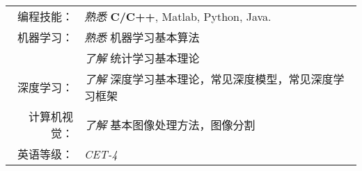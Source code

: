 %
%


 
\renewcommand{\arraystretch}{1.1}

	\begin{tabular}{>{}r>{}p{13cm}} 
		\textsc{编程技能：}     &  \emph{熟悉} \quad \textbf{C/C++}, Matlab, Python, Java.\\  
		\textsc{机器学习：} 	&  \emph{熟悉} \quad  机器学习基本算法 \\
							    &  \emph{了解} \quad  统计学习基本理论 \\
	    \textsc{深度学习：}     &  \emph{了解} \quad 深度学习基本理论，常见深度模型，常见深度学习框架 \\
		\textsc{计算机视觉：}   &  \emph{了解} \quad  基本图像处理方法，图像分割  \\
		\textsc{英语等级：}	    &  \textit{CET-4}\\
	\end{tabular}
	
